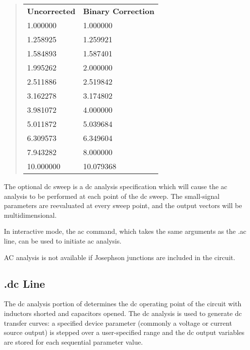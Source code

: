\begin{quote}
\begin{tabular}{ll}
\bf Uncorrected & \bf Binary Correction\\
1.000000 & 1.000000\\
1.258925 & 1.259921\\
1.584893 & 1.587401\\
1.995262 & 2.000000\\
2.511886 & 2.519842\\
3.162278 & 3.174802\\
3.981072 & 4.000000\\
5.011872 & 5.039684\\
6.309573 & 6.349604\\
7.943282 & 8.000000\\
10.000000 & 10.079368\\
\end{tabular}
\end{quote}

The optional dc sweep is a dc analysis specification which will cause
the ac analysis to be performed at each point of the dc sweep.  The
small-signal parameters are reevaluated at every sweep point, and the
output vectors will be multidimensional.

In interactive mode, the {\cb ac} command, which takes the same
arguments as the {\vt .ac} line, can be used to initiate ac analysis.

AC analysis is not available if Josephson junctions are included in the
circuit.

\subsection{{\vt .dc} Line}
\label{dcline}


The dc analysis portion of {\WRspice} determines the dc operating
point of the circuit with inductors shorted and capacitors opened. 
The dc analysis is used to generate dc transfer curves:  a specified
device parameter (commonly a voltage or current source output) is
stepped over a user-specified range and the dc output variables are
stored for each sequential parameter value.


